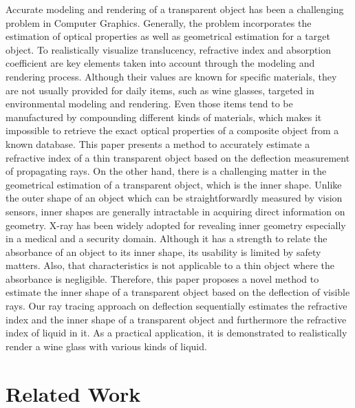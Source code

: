 \documentclass[10pt,twocolumn,letterpaper]{article}
\begin{document}
Accurate modeling and rendering of a transparent object has been a challenging problem in Computer Graphics. Generally, the problem incorporates the estimation of optical properties as well as geometrical estimation for a target object. To realistically visualize translucency, refractive index and absorption coefficient are key elements taken into account through the modeling and rendering process. Although their values are known for specific materials, they are not usually provided for daily items, such as wine glasses, targeted in environmental modeling and rendering. Even those items tend to be manufactured by compounding different kinds of materials, which makes it impossible to retrieve the exact optical properties of a composite object from a known database. This paper presents a method to accurately estimate a refractive index of a thin transparent object based on the deflection measurement of propagating rays. 
On the other hand, there is a challenging matter in the geometrical estimation of a transparent object, which is the inner shape. Unlike the outer shape of an object which can be straightforwardly measured by vision sensors, inner shapes are generally intractable in acquiring direct information on geometry. X-ray has been widely adopted for revealing inner geometry especially in a medical and a security domain. Although it has a strength to relate the absorbance of an object to its inner shape, its usability is limited by safety matters. Also, that characteristics is not applicable to a thin object where the absorbance is negligible. Therefore, this paper proposes a novel method to estimate the inner shape of a transparent object based on the deflection of visible rays. Our ray tracing approach on deflection sequentially estimates the refractive index and the inner shape of a transparent object and furthermore the refractive index of liquid in it. As a practical application, it is demonstrated to realistically render a wine glass with various kinds of liquid.

\section{Related Work}
\end{document}
